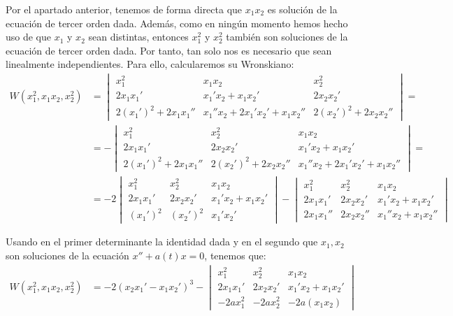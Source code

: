 \begin{ejercicio}
\begin{enumerate}
        Por el apartado anterior, tenemos de forma directa que $x_1x_2$ es solución de la ecuación de tercer orden dada. Además, como en ningún momento hemos hecho uso de que $x_1$ y $x_2$ sean distintas, entonces $x_1^2$ y $x_2^2$ también son soluciones de la ecuación de tercer orden dada. Por tanto, tan solo nos es necesario que sean linealmente independientes.
        Para ello, calcularemos su Wronskiano:
        \begin{align*}
            W(x_1^2,x_1x_2,x_2^2)&=\begin{vmatrix}
                x_1^2 & x_1x_2 & x_2^2\\
                2x_1x_1' & x_1'x_2+x_1x_2' & 2x_2x_2'\\
                2(x_1')^2+2x_1x_1'' & x_1''x_2+2x_1'x_2'+x_1x_2'' & 2(x_2')^2+2x_2x_2''
            \end{vmatrix}
            =\\&=
            -\begin{vmatrix}
                x_1^2 & x_2^2 & x_1x_2\\
                2x_1x_1' & 2x_2x_2' & x_1'x_2+x_1x_2'\\
                2(x_1')^2+2x_1x_1'' & 2(x_2')^2+2x_2x_2'' & x_1''x_2+2x_1'x_2'+x_1x_2''
            \end{vmatrix}
            =\\&=
            -2\begin{vmatrix}
                x_1^2 & x_2^2 & x_1x_2\\
                2x_1x_1' & 2x_2x_2' & x_1'x_2+x_1x_2'\\
                (x_1')^2 & (x_2')^2 & x_1'x_2'
            \end{vmatrix}
            -\begin{vmatrix}
                x_1^2 & x_2^2 & x_1x_2\\
                2x_1x_1' & 2x_2x_2' & x_1'x_2+x_1x_2'\\
                2x_1x_1'' & 2x_2x_2'' & x_1''x_2+x_1x_2''
            \end{vmatrix}
        \end{align*}

        Usando en el primer determinante la identidad dada y en el segundo que $x_1,x_2$ son soluciones de la ecuación $x''+a(t)x=0$, tenemos que:
        \begin{align*}
            W(x_1^2,x_1x_2,x_2^2)&=-2(x_2x_1'-x_1x_2')^3
            -\begin{vmatrix}
                x_1^2 & x_2^2 & x_1x_2\\
                2x_1x_1' & 2x_2x_2' & x_1'x_2+x_1x_2'\\
                -2ax_1^2 & -2ax_2^2 & -2a(x_1x_2)
            \end{vmatrix}
        \end{align*}


\end{enumerate}
\end{ejercicio}
